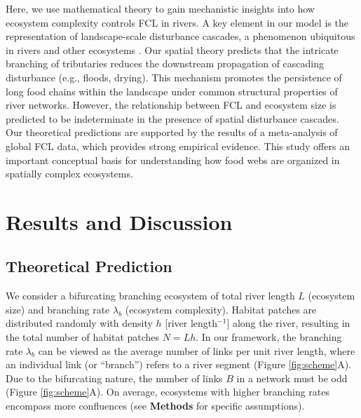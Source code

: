 \documentclass[11pt, class=article, crop=false]{standalone}
\begin{document}
Here, we use mathematical theory to gain mechanistic insights into how ecosystem complexity controls FCL in rivers.
A key element in our model is the representation of landscape-scale disturbance cascades, a phenomenon ubiquitous in rivers \citep{swanson_flood_1998, nakamura_disturbance_2000, sarremejane_drought_2021} and other ecosystems \citep{connell_30year_1997, cansler_climate_2014}.
Our spatial theory predicts that the intricate branching of tributaries reduces the downstream propagation of cascading disturbance (e.g., floods, drying).
This mechanism promotes the persistence of long food chains within the landscape under common structural properties of river networks.
However, the relationship between FCL and ecosystem size is predicted to be indeterminate in the presence of spatial disturbance cascades.
Our theoretical predictions are supported by the results of a meta-analysis of global FCL data, which provides strong empirical evidence.
This study offers an important conceptual basis for understanding how food webs are organized in spatially complex ecosystems.

\section{Results and Discussion}

\subsection{Theoretical Prediction}

We consider a bifurcating branching ecosystem of total river length $L$ (ecosystem size) and branching rate $\lambda_b$ (ecosystem complexity).
Habitat patches are distributed randomly with density $h$ [river length$^{-1}$] along the river, resulting in the total number of habitat patches $N = Lh$.
In our framework, the branching rate $\lambda_b$ can be viewed as the average number of links per unit river length, where an individual link (or ``branch'') refers to a river segment (Figure \ref{fig:scheme}A).
Due to the bifurcating nature, the number of links $B$ in a network must be odd (Figure \ref{fig:scheme}A).
On average, ecosystems with higher branching rates encompass more confluences (see \textbf{Methods} for specific assumptions).
\end{document}
